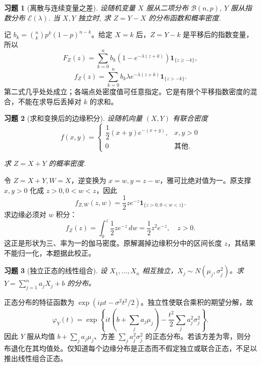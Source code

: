 \documentclass[UTF8,12pt,a4paper,fontset=fandol]{ctexart}
\newtheorem{exercise}{习题}[section]
\begin{document}
\begin{exercise}[离散与连续变量之差]\label{q:A4.19}
设随机变量 $X$ 服从二项分布 $\mathcal{B}(n,p)$, $Y$ 服从指数分布 $\mathcal{E}(\lambda)$. 当 $X,Y$ 独立时, 求 $Z=Y-X$ 的分布函数和概率密度.\par{}
\end{exercise}

\begin{solve}\label{a:A4.19}记 $b_k=\binom nkp^k(1-p)^{n-k}$。给定 $X=k$ 后，$Z=Y-k$ 是平移后的指数变量，所以\[F_Z(z)=\sum_{k=0}^n b_k(1-e^{-\lambda(z+k)})\mathbf1_{\{z\ge-k\}},\]\[f_Z(z)=\sum_{k=0}^n b_k\lambda e^{-\lambda(z+k)}\mathbf1_{\{z>-k\}}.\]第二式几乎处处成立；各端点处密度值可任意指定。它是有限个平移指数密度的混合，不能在求导后丢掉对 $k$ 的求和。\end{solve}

\begin{exercise}[求和变换后的边缘积分]\label{q:A4.23}
设随机向量 $(X,Y)$ 有联合密度
    \[f(x,y)=\begin{cases}
        \dfrac{1}{2}(x+y)e^{-(x+y)}, & x,y>0 \\
        0 & \text{其他}.
    \end{cases}\]

    求 $Z=X+Y$ 的概率密度.\par{}
\end{exercise}

\begin{solve}\label{a:A4.23}令 $Z=X+Y,W=X$，逆变换为 $x=w,y=z-w$，雅可比绝对值为一。原支撑 $x,y>0$ 化成 $z>0,0<w<z$，因此\[f_{Z,W}(z,w)=\frac12ze^{-z}\mathbf1_{\{z>0,0<w<z\}}.\]求边缘必须对 $w$ 积分：\[f_Z(z)=\int_0^z\frac12ze^{-z}\,dw=\frac12z^2e^{-z},\quad z>0.\]这正是形状为三、率为一的伽马密度。原解漏掉边缘积分中的区间长度 $z$，其结果不能归一化，本题据此校正。\end{solve}

\begin{exercise}[独立正态的线性组合]\label{q:A4.27}
设 $X_1,\ldots,X_n$ 相互独立，$X_j\sim N(\mu_j,\sigma_j^2)$。求 $Y=\sum_{j=1}^n a_jX_j+b$ 的分布。\par{}
\end{exercise}

\begin{solve}\label{a:A4.27}正态分布的特征函数为 $\exp(i\mu t-\sigma^2t^2/2)$。独立性使联合乘积的期望分解，故\[\varphi_Y(t)=\exp\left\{it\left(b+\sum_ja_j\mu_j\right)-\frac{t^2}{2}\sum_ja_j^2\sigma_j^2\right\}.\]因此 $Y$ 服从均值 $b+\sum_ja_j\mu_j$、方差 $\sum_ja_j^2\sigma_j^2$ 的正态分布。若该方差为零，则分布退化在其均值处。仅知道每个边缘分布是正态而不假定独立或联合正态，不足以推出线性组合正态。\end{solve}
\end{document}
